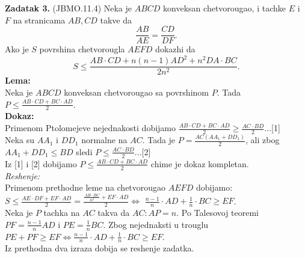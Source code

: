 \documentclass[11pt]{article}
\newcommand{\D}{\displaystyle}
\begin{document}
\newpage
\begin{flushleft}
\textbf{Zadatak 3.} (JBMO.11.4) Neka je $ABCD$ konveksan chetvorougao, i tachke $E$ i $F$ na stranicama $AB,CD$ takve da $$\D\frac{AB}{AE}=\frac{CD}{DF}.$$ Ako je $S$ povrshina chetvorougla $AEFD$ dokazhi da 
$${\D S\leq\frac{AB\cdot CD+n(n-1)AD^2+n^2DA\cdot BC}{2n^2}}.$$
\textbf{Lema:}\\
Neka je $ABCD$ konveksan chetvorougao sa povrshinom $P$. Tada $\D P\leq\frac{AB\cdot CD + BC\cdot AD}{2}.$\\
\vspace{0.5cm}
\textbf{Dokaz:}\\
Primenom Ptolomejeve nejednakosti dobijamo $\D \frac{AB\cdot CD + BC\cdot AD}{2}\geq \frac{AC\cdot BD}{2}$...[1]\\
Neka su $AA_1$ i $DD_1$ normalne na $AC$. Tada je $\D P=\frac{AC(AA_1+DD_1)}{2}$, ali zbog $AA_1+DD_1\leq BD$ sledi $\D P\leq \frac{AC\cdot BD}{2}$...[2]\\
\vspace{0.2cm}
Iz [1] i [2] dobijamo $\D P\leq \frac{AB\cdot CD + BC\cdot AD}{2}$ chime je dokaz kompletan.\\
\vspace{0.5cm}
\textit{Reshenje:}\\
\vspace{0.5cm}
Primenom prethodne leme na chetvorougao $AEFD$ dobijamo: 
$\D S\leq \frac{AE\cdot DF+EF\cdot AD}{2}=\frac{\D\frac{AB\cdot BC}{n^2}+EF\cdot AD}{2} \Longleftrightarrow$ $\D\frac{n-1}{n}\cdot AD+\frac{1}{n}\cdot BC\geq EF$.\\
\vspace{0.5cm}
Neka je $P$ tachka na $AC$ takva da $\D AC:AP=n$. Po Talesovoj teoremi $\D PF=\frac{n-1}{n}AD$ i $\D PE=\frac{1}{n} BC$. Zbog nejednaksti u trouglu $\D PE+PF\geq EF \Leftrightarrow \frac{n-1}{n}\cdot AD+\frac{1}{n}\cdot BC\geq EF$.\\
Iz prethodna dva izraza dobija se reshenje zadatka.
\end{flushleft}
\end{document}
